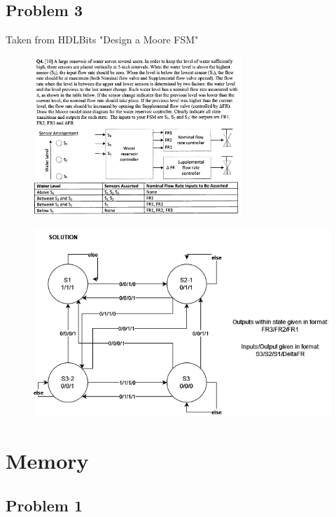 \documentclass{article}
\begin{document}
\subsection*{Problem 3}
Taken from HDLBits "Design a Moore FSM"\\
\begin{figure}[!h]
    \centering
    \includegraphics[width=0.7\textwidth]{figures/fsm_q3.png}
\end{figure}
\begin{figure}[!h]
    \centering
    \includegraphics[width=1\textwidth]{figures/fsm_q3-solution.png}
\end{figure}



\newpage
\section*{Memory}
\subsection*{Problem 1}
\end{document}
